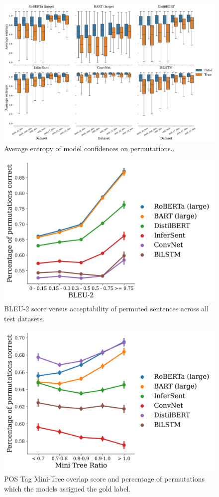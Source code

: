 \documentclass[letterpaper, 12pt]{report}
\begin{document}
\begin{figure}[htbp]
\centering
\includegraphics[width=.9\linewidth]{figs/unli/all_entropy.png}
\caption{Average entropy of model confidences on permutations..}
\end{figure}

\begin{figure}[htbp]
\centering
\includegraphics[width=.9\linewidth]{figs/unli/bleu_2_all.png}
\caption{BLEU-2 score versus acceptability of permuted sentences across all test datasets.}
\end{figure}

\begin{figure}[htbp]
\centering
\includegraphics[width=.9\linewidth]{figs/unli/min_tree_4.png}
\caption{POS Tag Mini-Tree overlap score and percentage of permutations which the models assigned the gold label.}
\end{figure}
\end{document}
